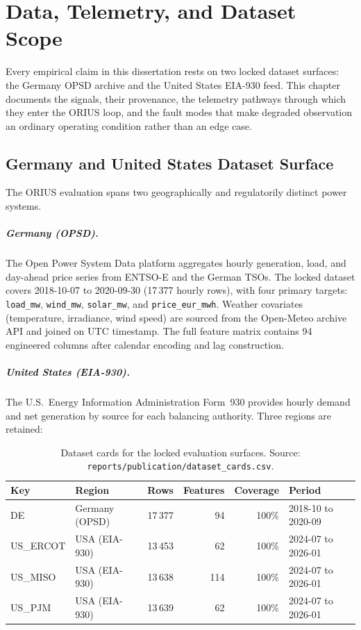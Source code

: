 
\chapter{Data, Telemetry, and Dataset Scope}
\label{ch:data-telemetry}

Every empirical claim in this dissertation rests on two locked dataset
surfaces: the Germany OPSD archive and the United States EIA-930 feed.  This
chapter documents the signals, their provenance, the telemetry pathways
through which they enter the ORIUS loop, and the fault modes that make
degraded observation an ordinary operating condition rather than an edge case.

\section{Germany and United States Dataset Surface}

The ORIUS evaluation spans two geographically and regulatorily distinct
power systems.

\paragraph{Germany (OPSD).}
The Open Power System Data platform aggregates hourly generation, load, and
day-ahead price series from ENTSO-E and the German TSOs.  The locked dataset
covers 2018-10-07 to 2020-09-30 (17\,377 hourly rows), with four primary
targets: \texttt{load\_mw}, \texttt{wind\_mw}, \texttt{solar\_mw}, and
\texttt{price\_eur\_mwh}.  Weather covariates (temperature, irradiance, wind
speed) are sourced from the Open-Meteo archive API and joined on UTC
timestamp.  The full feature matrix contains 94 engineered columns after
calendar encoding and lag construction.

\paragraph{United States (EIA-930).}
The U.S.\ Energy Information Administration Form~930 provides hourly
demand and net generation by source for each balancing authority.  Three
regions are retained:

\begin{table}[ht]
\centering
\caption{Dataset cards for the locked evaluation surfaces.  Source:
\texttt{reports/publication/dataset\_cards.csv}.}
\label{tab:dataset-cards}
\begin{tabular}{llrrrl}
\toprule
\textbf{Key} & \textbf{Region} & \textbf{Rows} & \textbf{Features} &
  \textbf{Coverage} & \textbf{Period} \\
\midrule
DE       & Germany (OPSD)    & 17\,377 & 94  & 100\% & 2018-10 to 2020-09 \\
US\_ERCOT & USA (EIA-930)    & 13\,453 & 62  & 100\% & 2024-07 to 2026-01 \\
US\_MISO  & USA (EIA-930)    & 13\,638 & 114 & 100\% & 2024-07 to 2026-01 \\
US\_PJM   & USA (EIA-930)    & 13\,639 & 62  & 100\% & 2024-07 to 2026-01 \\
\bottomrule
\end{tabular}
\end{table}

